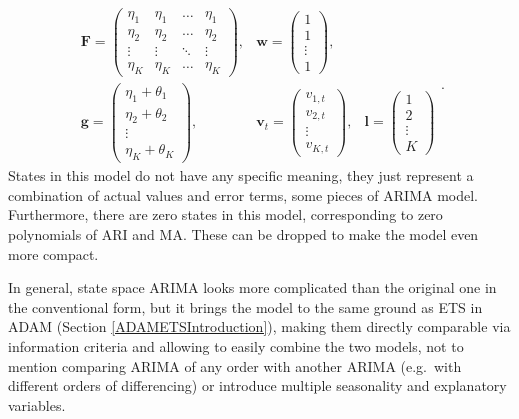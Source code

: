 \documentclass[
]{book}
\theoremstyle{definition}
\theoremstyle{definition}
\theoremstyle{definition}
\theoremstyle{definition}
\theoremstyle{remark}
\begin{document}
\begin{equation}
  \begin{aligned}
    \mathbf{F} = \begin{pmatrix} \eta_1 & \eta_1 & \dots & \eta_1 \\ \eta_2 & \eta_2 & \dots & \eta_2 \\ \vdots & \vdots & \ddots & \vdots \\ \eta_K & \eta_K & \dots & \eta_K \end{pmatrix}, & \mathbf{w} = \begin{pmatrix} 1 \\ 1 \\ \vdots \\ 1 \end{pmatrix}, \\
    \mathbf{g} = \begin{pmatrix} \eta_1 + \theta_1 \\ \eta_2 + \theta_2 \\ \vdots \\ \eta_K + \theta_K \end{pmatrix}, & \mathbf{v}_{t} = \begin{pmatrix} v_{1,t} \\ v_{2,t} \\ \vdots \\ v_{K,t} \end{pmatrix}, & \mathbf{l} = \begin{pmatrix} 1 \\ 2 \\ \vdots \\ K \end{pmatrix}
  \end{aligned}.
  \label{eq:ADAMARIMAMatrices}
\end{equation}
States in this model do not have any specific meaning, they just represent a combination of actual values and error terms, some pieces of ARIMA model. Furthermore, there are zero states in this model, corresponding to zero polynomials of ARI and MA. These can be dropped to make the model even more compact.

In general, state space ARIMA looks more complicated than the original one in the conventional form, but it brings the model to the same ground as ETS in ADAM (Section \ref{ADAMETSIntroduction}), making them directly comparable via information criteria and allowing to easily combine the two models, not to mention comparing ARIMA of any order with another ARIMA (e.g.~with different orders of differencing) or introduce multiple seasonality and explanatory variables.
\end{document}
